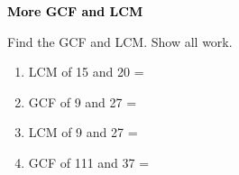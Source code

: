 \documentclass[12pt, letterpaper, fleqn]{article}
\newcommand{\blank}{\underline{\hspace{2.2cm}}}
\begin{document}
\newpage

\begin{tcolorbox}[colback=black!10]
\large\textcolor{black}{\textbf{More GCF and LCM}}
\end{tcolorbox}

\noindent
Find the GCF and LCM. Show all work.

\vspace{3mm}
\begin{enumerate}[itemsep=2.4cm, leftmargin=0.6cm]
\item LCM of 15 and 20 = \blank

\vspace{1.8cm}

\item GCF of 9 and 27 = \blank

\vspace{1.8cm}

\item LCM of 9 and 27 = \blank

\vspace{1.8cm}

\item GCF of 111 and 37 = \blank

\vspace{1.8cm}

\end{enumerate}
\end{document}
